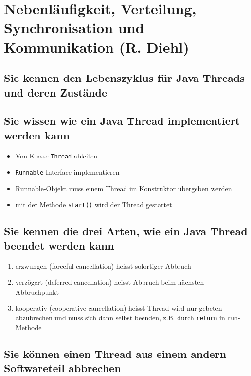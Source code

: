 \section{Nebenläufigkeit, Verteilung, Synchronisation und Kommunikation (R. Diehl)}
\label{sec:diehl}

\subsection{Sie kennen den Lebenszyklus für Java Threads und deren Zustände}


\subsection{Sie wissen wie ein Java Thread implementiert werden kann}

\begin{itemize}
	\item Von Klasse \texttt{Thread} ableiten
	\item \texttt{Runnable}-Interface implementieren
	\item Runnable-Objekt muss einem Thread im Konstruktor übergeben werden
	\item mit der Methode \texttt{start()} wird der Thread gestartet
\end{itemize}

\subsection{Sie kennen die drei Arten, wie ein Java Thread beendet werden kann}

\begin{enumerate}
	\item erzwungen (forceful cancellation) heisst sofortiger Abbruch
	\item verzögert (deferred cancellation) heisst Abbruch beim nächsten Abbruchpunkt
	\item kooperativ (cooperative cancellation) heisst Thread wird nur gebeten abzubrechen und muss sich dann selbst beenden, z.B. durch \texttt{return} in \texttt{run}-Methode
\end{enumerate}

\subsection{Sie können einen Thread aus einem andern Softwareteil abbrechen}


